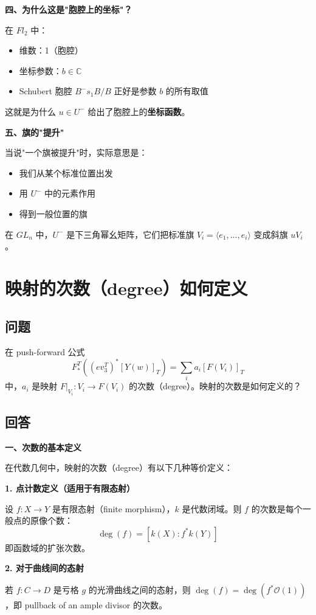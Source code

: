 \textbf{四、为什么这是"胞腔上的坐标"？}

在 $Fl_2$ 中：
\begin{itemize}
\item 维数：1（胞腔）
\item 坐标参数：$b \in \mathbb{C}$
\item Schubert 胞腔 $B^-s_1B/B$ 正好是参数 $b$ 的所有取值
\end{itemize}

这就是为什么 $u \in U^-$ 给出了胞腔上的\textbf{坐标函数}。

\textbf{五、旗的"提升"}

当说"一个旗被提升"时，实际意思是：
\begin{itemize}
\item 我们从某个标准位置出发
\item 用 $U^-$ 中的元素作用
\item 得到一般位置的旗
\end{itemize}

在 $GL_n$ 中，$U^-$ 是下三角幂幺矩阵，它们把标准旗 $V_i = \langle e_1, \ldots, e_i \rangle$ 变成斜旗 $u V_i$。

\section{映射的次数（degree）如何定义}\label{sec:qa-morphism-degree}
\subsection{问题}
在 push-forward 公式
$$F_*^T\left((ev_3^T)^*[Y(w)]_T\right) = \sum_i a_i [F(V_i)]_T$$
中，$a_i$ 是映射 $F|_{V_i} : V_i \to F(V_i)$ 的次数（degree）。映射的次数是如何定义的？
\subsection{回答}
\textbf{一、次数的基本定义}

在代数几何中，映射的次数（degree）有以下几种等价定义：

\textbf{1. 点计数定义（适用于有限态射）}

设 $f: X \to Y$ 是有限态射（finite morphism），$k$ 是代数闭域。则 $f$ 的次数是每个一般点的原像个数：
$$\deg(f) = [k(X) : f^*k(Y)]$$
即函数域的扩张次数。

\textbf{2. 对于曲线间的态射}

若 $f: C \to D$ 是亏格 $g$ 的光滑曲线之间的态射，则 $\deg(f) = \deg(f^*\mathcal{O}(1))$，即 pullback of an ample divisor 的次数。


